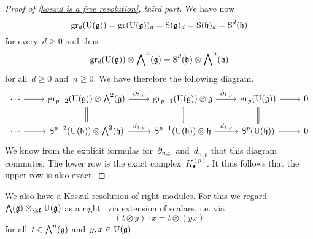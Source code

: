 \begin{proof}[Proof of \cref{koszul is a free resolution}, third part]
	We have now
	\[
		\gr[d](\Univ(\glie))
		=
		\gr(\Univ(\glie))_d
		=
		\Symm(\glie)_d
		=
		\Symm(\hlie)_d
		=
		\Symm^d(\hlie)
	\]
	for every~$d \geq 0$ and thus
	\[
		\gr[d]( \Univ(\glie) ) \otimes \Exterior^n(\glie)
		=
		\Symm^d( \hlie ) \otimes \Exterior^n(\hlie)
	\]
	for all~$d \geq 0$ and~$n \geq 0$.
	We have therefore the following diagram.
	\[
		\begin{tikzcd}
			\dotsb
			\arrow{r}
			&
			\gr[p-2]( \Univ(\glie) ) \otimes \Exterior^2(\glie)
			\arrow{r}[above]{\del_{2,p}}
			\arrow[equal]{d}
			&
			\gr[p-1]( \Univ(\glie) ) \otimes \glie
			\arrow{r}[above]{\del_{1,p}}
			\arrow[equal]{d}
			&
			\gr[p]( \Univ(\glie) )
			\arrow{r}
			\arrow[equal]{d}
			&
			0
			\\
			\dotsb
			\arrow{r}
			&
			\Symm^{p-2}( \Univ(\hlie) ) \otimes \Exterior^2(\hlie)
			\arrow{r}[above]{d_{2,p}}
			&
			\Symm^{p-1}( \Univ(\hlie) ) \otimes \hlie
			\arrow{r}[above]{d_{1,p}}
			&
			\Symm^p( \Univ(\hlie) )
			\arrow{r}
			&
			0
		\end{tikzcd}
	\]
	We know from the explicit formulas for~$\partial_{n,p}$ and~$d_{n,p}$ that this diagram commutes.
	The lower row is the exact complex~$K^{(p)}_\bullet$.
	It thus follows that the upper row is also exact.
\end{proof}


\begin{fluff}
	We also have a Koszul resolution of right modules.
	For this we regard~$\Exterior(\glie) \otimes_{\kf} \Univ(\glie)$ as a right~\module{$\Univ(\glie)$} via extension of scalars, i.e. via
	\[
		(t \otimes y) \cdot x
		=
		t \otimes (yx)
	\]
	for all~$t \in \operatorname{\bigwedge}^n(\mathfrak{g})$ and~$y, x \in \operatorname{U}(\mathfrak{g})$.
\end{fluff}


